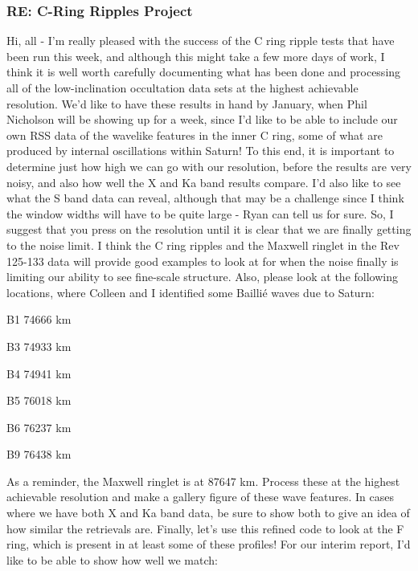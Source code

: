 \documentclass[crop=false,class=book]{standalone}
\begin{document}
\subsubsection{\footnotesize RE: C-Ring Ripples Project}
Hi, all - I'm really pleased with the success of the C ring ripple tests that have been run this week, and although this might take a few more days of work, I think it is well worth carefully documenting what has been done and processing all of the low-inclination occultation data sets at the highest achievable resolution. We'd like to have these results in hand by January, when Phil Nicholson will be showing up for a week, since I'd like to be able to include our own RSS data of the wavelike features in the inner C ring, some of what are produced by internal oscillations within Saturn!
To this end, it is important to determine just how high we can go with our resolution, before the results are very noisy, and also how well the X and Ka band results compare. I'd also like to see what the S band data can reveal, although that may be a challenge since I think the window widths will have to be quite large - Ryan can tell us for sure. So, I suggest that you press on the resolution until it is clear that we are finally getting to the noise limit. I think the C ring ripples and the Maxwell ringlet in the Rev 125-133 data will provide good examples to look at for when the noise finally is limiting our ability to see fine-scale structure. Also, please look at the following locations, where Colleen and I identified some Baillié waves due to Saturn:
\begin{itemize}
\begin{multicols}{3}
    \item B1 74666 km
    \item B3 74933 km
    \item B4 74941 km
    \item B5 76018 km
    \item B6 76237 km
    \item B9 76438 km
\end{multicols}
\end{itemize}
As a reminder, the Maxwell ringlet is at 87647 km.
Process these at the highest achievable resolution and make a gallery figure of these wave features. In cases where we have both X and Ka band data, be sure to show both to give an idea of how similar the retrievals are. 
Finally, let's use this refined code to look at the F ring, which is present in at least some of these profiles!
For our interim report, I'd like to be able to show how well we match:
\end{document}
